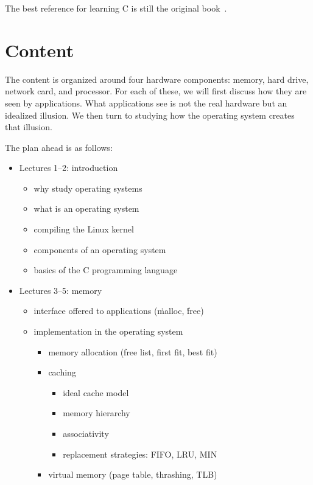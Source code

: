 \smallskip

The best reference for learning C is still the original book~\citep{c-book}.

\section{Content}

The content is organized around four hardware components:
  memory, hard drive, network card, and processor.
For each of these,
  we will first discuss how they are seen by applications.
What applications see is not the real hardware but an idealized illusion.
We then turn to studying how the operating system creates that illusion.

The plan ahead is as follows:

\begin{itemize}
\item Lectures 1--2: introduction
  \begin{itemize}
  \item why study operating systems
  \item what is an operating system
  \item compiling the Linux kernel
  \item components of an operating system
  \item basics of the C programming language
  \end{itemize}
\item Lectures 3--5: memory
  \begin{itemize}
  \item interface offered to applications (\.{malloc}, \.{free})
  \item implementation in the operating system
    \begin{itemize}
    \item memory allocation (free list, first fit, best fit)
    \item caching
      \begin{itemize}
      \item ideal cache model
      \item memory hierarchy
      \item associativity
      \item replacement strategies: FIFO, LRU, MIN
      \end{itemize}
    \item virtual memory (page table, thrashing, TLB)
    \end{itemize}
  \end{itemize}

\end{itemize}
